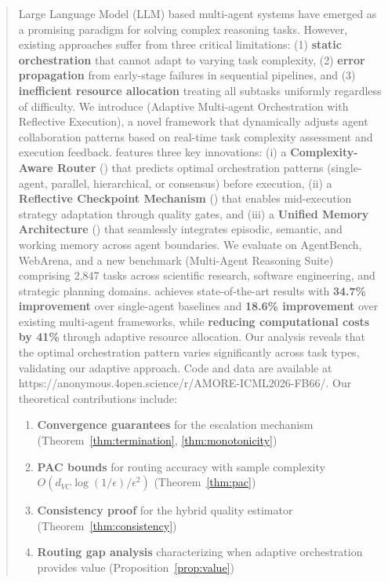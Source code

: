 \documentclass{article}
\theoremstyle{plain}
\theoremstyle{definition}
\theoremstyle{remark}
\begin{document}
\begin{abstract}
Large Language Model (LLM) based multi-agent systems have emerged as a promising paradigm for solving complex reasoning tasks. However, existing approaches suffer from three critical limitations: (1) \textbf{static orchestration} that cannot adapt to varying task complexity, (2) \textbf{error propagation} from early-stage failures in sequential pipelines, and (3) \textbf{inefficient resource allocation} treating all subtasks uniformly regardless of difficulty. We introduce \textbf{\amore{}} (Adaptive Multi-agent Orchestration with Reflective Execution), a novel framework that dynamically adjusts agent collaboration patterns based on real-time task complexity assessment and execution feedback. \amore{} features three key innovations: (i) a \textbf{Complexity-Aware Router} (\car{}) that predicts optimal orchestration patterns (single-agent, parallel, hierarchical, or consensus) before execution, (ii) a \textbf{Reflective Checkpoint Mechanism} (\rcm{}) that enables mid-execution strategy adaptation through quality gates, and (iii) a \textbf{Unified Memory Architecture} (\uma{}) that seamlessly integrates episodic, semantic, and working memory across agent boundaries. We evaluate \amore{} on AgentBench, WebArena, and a new benchmark \textbf{\mars{}} (Multi-Agent Reasoning Suite) comprising 2,847 tasks across scientific research, software engineering, and strategic planning domains. \amore{} achieves state-of-the-art results with \textbf{34.7\% improvement} over single-agent baselines and \textbf{18.6\% improvement} over existing multi-agent frameworks, while \textbf{reducing computational costs by 41\%} through adaptive resource allocation. Our analysis reveals that the optimal orchestration pattern varies significantly across task types, validating our adaptive approach. Code and data are available at https://anonymous.4open.science/r/AMORE-ICML2026-FB66/. Our theoretical contributions include:
\begin{enumerate}
	\item \textbf{Convergence guarantees} for the escalation
	mechanism (Theorem~\ref{thm:termination}, \ref{thm:monotonicity})
	\item \textbf{PAC bounds} for routing accuracy with sample
	complexity $O(d_{VC} \log(1/\epsilon) / \epsilon^2)$
	(Theorem~\ref{thm:pac})
	\item \textbf{Consistency proof} for the hybrid quality
	estimator (Theorem~\ref{thm:consistency})
	\item \textbf{Routing gap analysis} characterizing when
	adaptive orchestration provides value (Proposition~\ref{prop:value})
\end{enumerate}
\end{abstract}
\end{document}
